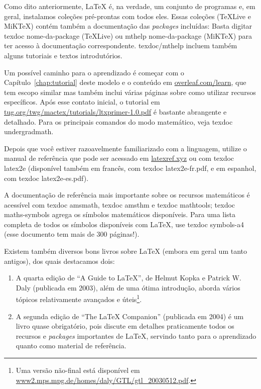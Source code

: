 Como dito anteriormente, \LaTeX{} é, na verdade, um conjunto de programas
e, em geral, instalamos coleções pré-prontas com todos eles. Essas coleções
(\TeX{}Live e MiK\TeX{}) contém também a documentação das \textit{packages}
incluídas: Basta digitar \textsf{texdoc nome-da-package} (\TeX{}Live) ou
\textsf{mthelp nome-da-package} (MiK\TeX{}) para ter acesso à documentação
correspondente. \textsf{texdoc/mthelp} incluem também alguns tutoriais e
textos introdutórios.

Um possível caminho para o aprendizado é começar com o
Capítulo~\ref{chap:tutorial} deste modelo e o conteúdo em
\url{overleaf.com/learn}, que tem escopo similar mas também inclui várias
páginas sobre como utilizar recursos específicos. Após esse contato inicial,
o tutorial em \url{tug.org/twg/mactex/tutorials/ltxprimer-1.0.pdf} é
bastante abrangente e detalhado. Para os principais comandos do modo
matemático, veja \textsf{texdoc undergradmath}.

Depois que você estiver razoavelmente
familiarizado com a linguagem, utilize o manual de referência que pode ser
acessado em \url{latexref.xyz} ou com \textsf{texdoc latex2e} (disponível
também em francês, com \textsf{texdoc latex2e-fr.pdf}, e em espanhol, com
\textsf{texdoc latex2e-es.pdf}).

A documentação de referência mais importante sobre os recursos matemáticos
é acessível com \textsf{texdoc amsmath}, \textsf{texdoc amsthm} e
\textsf{texdoc mathtools}; \textsf{texdoc maths-symbols} agrega os símbolos
matemáticos disponíveis. Para uma lista completa de todos os símbolos
disponíveis com \LaTeX{}, use \textsf{texdoc symbols-a4} (esse documento
tem mais de 300 páginas!).

Existem também diversos bons livros sobre \LaTeX{} (embora em geral um
tanto antigos), dos quais destacamos dois:

\begin{enumerate}

  \item A quarta edição de ``A Guide to \LaTeX'', de Helmut Kopka
        e Patrick W. Daly (publicada em 2003), além de uma ótima
        introdução, aborda vários tópicos relativamente avançados
        e úteis\footnote{Uma versão não-final está disponível em
        \url{www2.mps.mpg.de/homes/daly/GTL/gtl_20030512.pdf}.}.
  \item A segunda edição de ``The \LaTeX{} Companion'' (publicada em
        2004) é um livro quase obrigatório, pois discute em detalhes
        praticamente todos os recursos e \textit{packages} importantes
        de \LaTeX{}, servindo tanto para o aprendizado quanto como
        material de referência.

\end{enumerate}

